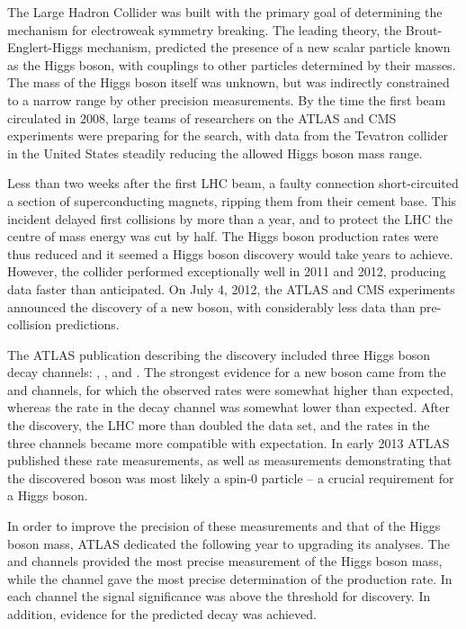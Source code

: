 
The Large Hadron Collider was built with the primary goal of determining the mechanism for 
electroweak symmetry breaking. The leading theory, the Brout-Englert-Higgs mechanism, 
predicted the presence of a new scalar particle known as the Higgs boson, with couplings to 
other particles determined by their masses. The mass of the Higgs boson itself was unknown, 
but was indirectly constrained to a narrow range by other precision measurements. By the time 
the first beam circulated in 2008, large teams of researchers on the ATLAS and CMS 
experiments were preparing for the search, with data from the Tevatron collider in the United 
States steadily reducing the allowed Higgs boson mass range.

Less than two weeks after the first LHC beam, a faulty connection short-circuited a section 
of superconducting magnets, ripping them from their cement base. This incident delayed first 
collisions by more than a year, and to protect the LHC the centre of mass energy was cut by 
half. The Higgs boson production rates were thus reduced and it seemed a Higgs boson 
discovery would take years to achieve. However, the collider performed exceptionally well in 
2011 and 2012, producing data faster than anticipated. On July 4, 2012, the ATLAS and CMS 
experiments announced the discovery of a new boson, with considerably less data than 
pre-collision predictions.

The ATLAS publication describing the discovery included three Higgs boson decay channels: 
\HepProcess{\PHiggs \HepTo \Pphoton\Pphoton}, \HepProcess{\PHiggs \HepTo \PZ\PZ}, and \HWW. 
The strongest evidence for a new boson came from the \HepProcess{\PHiggs \HepTo 
\Pphoton\Pphoton} and \HepProcess{\PHiggs \HepTo \PZ\PZ} channels, for which the observed 
rates were somewhat higher than expected, whereas the rate in the \HWW decay channel was 
somewhat lower than expected. After the discovery, the LHC more than doubled the data set, 
and the rates in the three channels became more compatible with expectation. In early 2013 
ATLAS published these rate measurements, as well as measurements demonstrating that the 
discovered boson was most likely a spin-0 particle -- a crucial requirement for a Higgs boson.

In order to improve the precision of these measurements and that of the Higgs boson mass, 
ATLAS dedicated the following year to upgrading its analyses. The \HepProcess{\PHiggs \HepTo 
\Pphoton\Pphoton} and \HepProcess{\PHiggs \HepTo \PZ\PZ} channels provided the most precise 
measurement of the Higgs boson mass, while the \HWW channel gave the most precise 
determination of the production rate. In each channel the signal significance was above the 
threshold for discovery. In addition, evidence for the predicted \HepProcess{\PHiggs \HepTo 
\Ptau\Ptau} decay was achieved.

